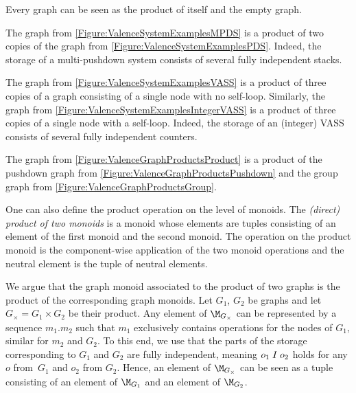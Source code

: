 \documentclass[../../diss.tex]{subfiles}
\begin{document}
\begin{example}
    \begin{thmenumerate}[a)]
        \item
            Every graph can be seen as the product of itself and the empty graph.
        \item
            The graph from \cref{Figure:ValenceSystemExamplesMPDS} is a product of two copies of the graph from \cref{Figure:ValenceSystemExamplesPDS}.
            Indeed, the storage of a multi-pushdown system consists of several fully independent stacks.
        \item
            The graph from \cref{Figure:ValenceSystemExamplesVASS} is a product of three copies of a graph consisting of a single node with no self-loop.
            Similarly, the graph from \cref{Figure:ValenceSystemExamplesIntegerVASS} is a product of three copies of a single node with a self-loop.
            Indeed, the storage of an (integer) VASS consists of several fully independent counters.
        \item
            The graph from \cref{Figure:ValenceGraphProductsProduct} is a product of the pushdown graph from \cref{Figure:ValenceGraphProductsPushdown} and the group graph from \cref{Figure:ValenceGraphProductsGroup}.
    \end{thmenumerate}
\end{example}

\begin{remark*}
    One can also define the product operation on the level of monoids.
    The \emph{(direct) product of two monoids} is a monoid whose elements are tuples consisting of an element of the first monoid and the second monoid.
    The operation on the product monoid is the component-wise application of the two monoid operations and the neutral element is the tuple of neutral elements.

    We argue that the graph monoid associated to the product of two graphs is the product of the corresponding graph monoids.
    Let $G_1$, $G_2$ be graphs and let $G_\times = G_1 \times G_2$ be their product.
    Any element of $\graphmonoid{G_\times}$ can be represented by a sequence $m_1.m_2$ such that $m_1$ exclusively contains operations for the nodes of $G_1$, similar for $m_2$ and $G_2$.
    To this end, we use that the parts of the storage corresponding to $G_1$ and $G_2$ are fully independent, meaning $o_1 \mathrel{I} o_2$ holds for any $o$ from~$G_1$ and $o_2$ from $G_2$.
    Hence, an element of $\graphmonoid{G_\times}$ can be seen as a tuple consisting of an element of $\graphmonoid{G_1}$ and an element of $\graphmonoid{G_2}$.
\end{remark*}
\end{document}
